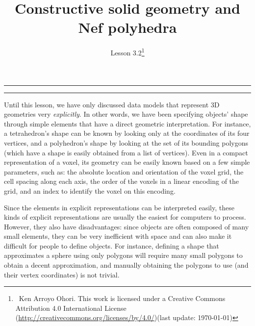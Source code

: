 
\newcommand{\lessonNumber}{Lesson 3.2}

\newtheorem{definition}{Definition}

\title{Constructive solid geometry and Nef polyhedra}


\ohead*{\lessonNumber}
\titlehead{\thispagestyle{headings}}
\author{\lessonNumber\footnote{\ccbysa\ Ken Arroyo Ohori. This work is licensed under a Creative Commons Attribution 4.0 International License (\url{http://creativecommons.org/licenses/by/4.0/})\newline(last update: \today)}}
\date{}

\pagestyle{scrheadings}

\maketitle

\noindent\rule{5cm}{0.4pt}
\tableofcontents
\noindent\rule{5cm}{0.4pt}
\vspace{5mm}



Until this lesson, we have only discussed data models that represent 3D geometries very \emph{explicitly}.
In other words, we have been specifying objects' shape through simple elements that have a direct geometric interpretation.
For instance, a tetrahedron's shape can be known by looking only at the coordinates of its four vertices, and a polyhedron's shape by looking at the set of its bounding polygons (which have a shape is easily obtained from a list of vertices).
Even in a compact representation of a voxel, its geometry can be easily known based on a few simple parameters, such as: the absolute location and orientation of the voxel grid, the cell spacing along each axis, the order of the voxels in a linear encoding of the grid, and an index to identify the voxel on this encoding.


Since the elements in explicit representations can be interpreted easily, these kinds of explicit representations are usually the easiest for computers to process.
However, they also have disadvantages: since objects are often composed of many small elements, they can be very inefficient with space and can also make it difficult for people to define objects.
For instance, defining a shape that approximates a sphere using only polygons will require many small polygons to obtain a decent approximation, and manually obtaining the polygons to use (and their vertex coordinates) is not trivial.

